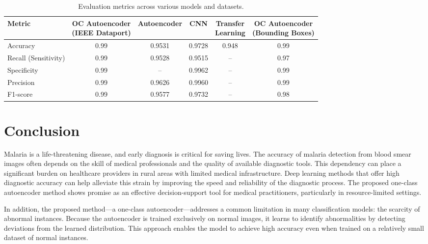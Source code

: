 \documentclass[journal,12pt,onecolumn,draftcls]{IEEEtran}
\begin{document}
\begin{table}[H]
  \caption{Evaluation metrics across various models and datasets.}
  \label{table:eval_metrics}
  \centering
  \begin{tabular}{l|c|c|c|c|c}
    \hline
    \textbf{Metric} &
    \makecell[c]{OC Autoencoder\\(IEEE Dataport)} &
    \textbf{Autoencoder} &
    \textbf{CNN} &
    \makecell[c]{Transfer\\Learning} &
    \makecell[c]{OC Autoencoder\\(Bounding Boxes)} \\
    \hline
    Accuracy & 0.99 & 0.9531 & 0.9728 & 0.948 & 0.99 \\
    Recall (Sensitivity) & 0.99 & 0.9528 & 0.9515 & -- & 0.97 \\
    Specificity & 0.99 & -- & 0.9962 & -- & 0.99 \\
    Precision & 0.99 & 0.9626 & 0.9960 & -- & 0.99 \\
    F1-score & 0.99 & 0.9577 & 0.9732 & -- & 0.98 \\
    \hline
  \end{tabular}
\end{table}

\section{Conclusion}
Malaria is a life-threatening disease, and early diagnosis is critical for saving lives. The accuracy of malaria detection from blood smear images often depends on the skill of medical professionals and the quality of available diagnostic tools. This dependency can place a significant burden on healthcare providers in rural areas with limited medical infrastructure. Deep learning methods that offer high diagnostic accuracy can help alleviate this strain by improving the speed and reliability of the diagnostic process. The proposed one-class autoencoder method shows promise as an effective decision-support tool for medical practitioners, particularly in resource-limited settings.

In addition, the proposed method—a one-class autoencoder—addresses a common limitation in many classification models: the scarcity of abnormal instances. Because the autoencoder is trained exclusively on normal images, it learns to identify abnormalities by detecting deviations from the learned distribution. This approach enables the model to achieve high accuracy even when trained on a relatively small dataset of normal instances.

\newpage


\end{document}
